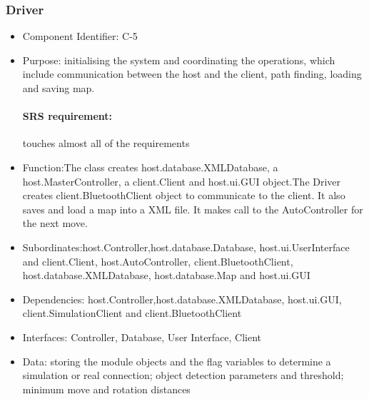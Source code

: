 \documentclass[11pt, a4paper]{report}
\begin{document}
\subsubsection{Driver}
\begin{itemize}
\item Component Identifier: C-5 
\item Purpose: initialising the system and coordinating the operations, 
which include communication between the host and the client, path finding,
loading and saving map.
\paragraph{SRS requirement:} touches almost all of the requirements
\item Function:The class creates host.database.XMLDatabase, a host.MasterController,
a client.Client and host.ui.GUI object.The Driver creates client.BluetoothClient object to communicate to the client. It also saves and load a map
 into a XML file. It makes call to the AutoController for the next move.
\item Subordinates:host.Controller,host.database.Database, host.ui.UserInterface and
 client.Client, host.AutoController, client.BluetoothClient,
host.database.XMLDatabase, host.database.Map and host.ui.GUI
\item Dependencies: host.Controller,host.database.XMLDatabase, host.ui.GUI,
 client.SimulationClient and client.BluetoothClient
\item Interfaces: Controller, Database, User Interface, Client
\item Data: storing the module objects and the flag variables to determine a simulation
or real connection; object detection parameters and threshold; minimum move and rotation distances 
\end{itemize}
\end{document}
